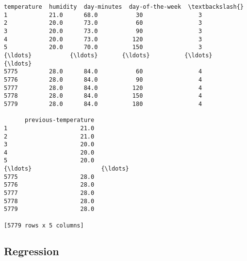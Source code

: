 \documentclass[11pt,a3paper]{article}
\makeatletter
\newcommand{\boxspacing}{\kern\kvtcb@left@rule\kern\kvtcb@boxsep}
\newcommand{\prompt}[4]{
        {\ttfamily\llap{{\color{#2}[#3]:\hspace{3pt}#4}}\vspace{-\baselineskip}}
    }
\makeatother
\begin{document}
            \begin{tcolorbox}[breakable, size=fbox, boxrule=.5pt, pad at break*=1mm, opacityfill=0]
\prompt{Out}{outcolor}{8}{\boxspacing}
\begin{Verbatim}[commandchars=\\\{\}]
      temperature  humidity  day-minutes  day-of-the-week  \textbackslash{}
1            21.0      68.0           30                3
2            20.0      73.0           60                3
3            20.0      73.0           90                3
4            20.0      73.0          120                3
5            20.0      70.0          150                3
{\ldots}           {\ldots}       {\ldots}          {\ldots}              {\ldots}
5775         28.0      84.0           60                4
5776         28.0      84.0           90                4
5777         28.0      84.0          120                4
5778         28.0      84.0          150                4
5779         28.0      84.0          180                4

      previous-temperature
1                     21.0
2                     21.0
3                     20.0
4                     20.0
5                     20.0
{\ldots}                    {\ldots}
5775                  28.0
5776                  28.0
5777                  28.0
5778                  28.0
5779                  28.0

[5779 rows x 5 columns]
\end{Verbatim}
\end{tcolorbox}
        
    \hypertarget{regression}{%
\subsection{Regression}\label{regression}}
\end{document}
